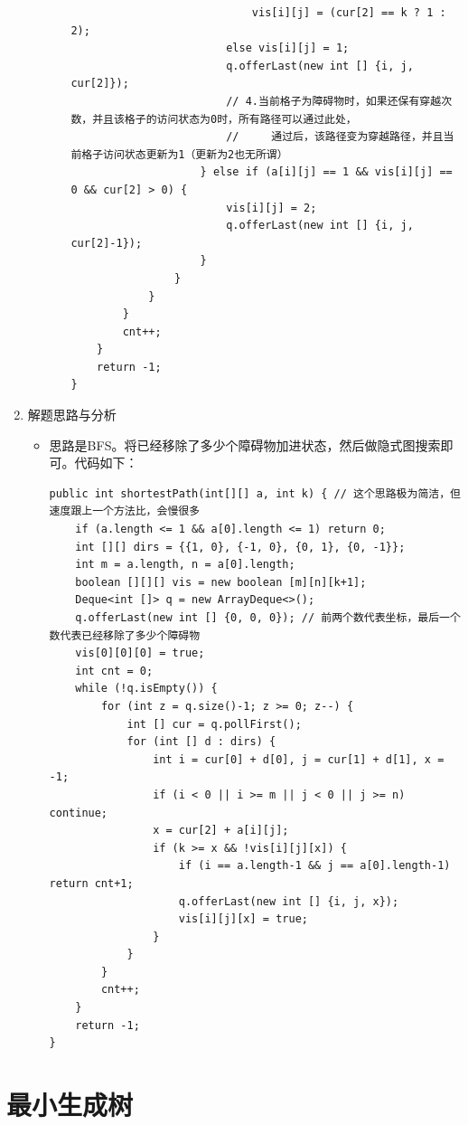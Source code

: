 \documentclass[9pt, b5paaper]{book}
\begin{document}
\begin{enumerate}
\begin{itemize}
\begin{itemize}
\begin{verbatim}
                            vis[i][j] = (cur[2] == k ? 1 : 2);
                        else vis[i][j] = 1;
                        q.offerLast(new int [] {i, j, cur[2]});
                        // 4.当前格子为障碍物时，如果还保有穿越次数，并且该格子的访问状态为0时，所有路径可以通过此处，
                        //     通过后，该路径变为穿越路径，并且当前格子访问状态更新为1（更新为2也无所谓）                                
                    } else if (a[i][j] == 1 && vis[i][j] == 0 && cur[2] > 0) {
                        vis[i][j] = 2;
                        q.offerLast(new int [] {i, j, cur[2]-1});
                    }
                }
            }
        }
        cnt++;
    }
    return -1;
}
\end{verbatim}
\end{itemize}
\end{itemize}
\item 解题思路与分析
\label{sec-1-8-1-2}
\begin{itemize}
\item 思路是BFS。将已经移除了多少个障碍物加进状态，然后做隐式图搜索即可。代码如下：
\begin{verbatim}
public int shortestPath(int[][] a, int k) { // 这个思路极为简洁，但速度跟上一个方法比，会慢很多
    if (a.length <= 1 && a[0].length <= 1) return 0;
    int [][] dirs = {{1, 0}, {-1, 0}, {0, 1}, {0, -1}};
    int m = a.length, n = a[0].length;
    boolean [][][] vis = new boolean [m][n][k+1];
    Deque<int []> q = new ArrayDeque<>();
    q.offerLast(new int [] {0, 0, 0}); // 前两个数代表坐标，最后一个数代表已经移除了多少个障碍物
    vis[0][0][0] = true;
    int cnt = 0;
    while (!q.isEmpty()) {
        for (int z = q.size()-1; z >= 0; z--) {
            int [] cur = q.pollFirst();
            for (int [] d : dirs) {
                int i = cur[0] + d[0], j = cur[1] + d[1], x = -1;
                if (i < 0 || i >= m || j < 0 || j >= n) continue;
                x = cur[2] + a[i][j];
                if (k >= x && !vis[i][j][x]) {
                    if (i == a.length-1 && j == a[0].length-1) return cnt+1;
                    q.offerLast(new int [] {i, j, x});
                    vis[i][j][x] = true;
                }
            }
        }
        cnt++;
    }
    return -1;
}
\end{verbatim}
\end{itemize}
\end{enumerate}


\section{最小生成树}
\label{sec-1-9}
\end{document}
